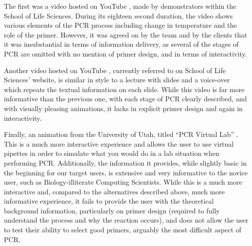 The first was a video hosted on YouTube \cite{youtube:taqExtension},
made by demonstrators within the School of Life Sciences.
During its eighteen second duration, the video shows various elements
of the PCR process including change in temperature and the role of the
primer.
However, it was agreed on by the team and by the clients that it was
insubstantial in terms of information delivery, as several of the
stages of PCR are omitted with no mention of primer design, and in
terms of interactivity.

Another video hosted on YouTube \cite{youtube:PCR}, currently referred
to on School of Life Sciences' website, is similar in style to a
lecture with slides and a voice-over which repeats the textual
information on each slide.
While this video is far more informative than the previous one, with
each stage of PCR clearly described, and with visually pleasing
animations, it lacks in explicit primer design and again in
interactivity.

Finally, an animation from the University of Utah, titled ``PCR
Virtual Lab'' \cite{genScienceCenter2012}.
This is a much more interactive experience and allows the user to use
virtual pipettes in order to simulate what you would do in a lab
situation when performing PCR.
Additionally, the information it provides, while slightly basic in the
beginning for our target users, is extensive and very informative to
the novice user, such as Biology-illiterate Computing Scientists.
While this is a much more interactive and, compared to the
alternatives described above, much more informative experience, it
fails to provide the user with the theoretical background information,
particularly on primer design (required to fully understand the
process and why the reaction occurs), and does not allow the user to
test their ability to select good primers, arguably the most difficult
aspect of PCR.																									%
